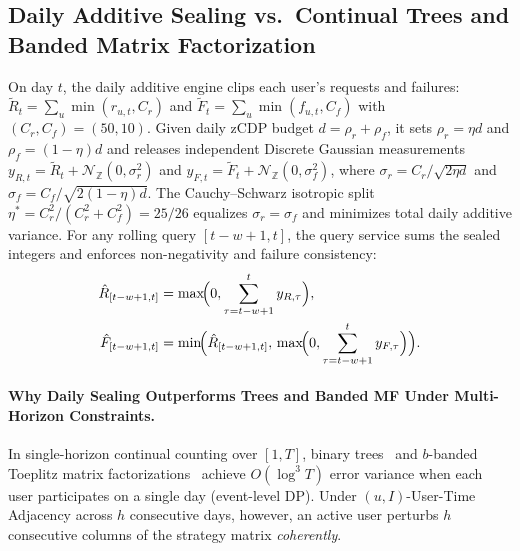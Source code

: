\documentclass[sigconf, nonacm]{acmart}
\begin{document}
\subsection{Daily Additive Sealing vs.\ Continual Trees and Banded Matrix Factorization}
On day $t$, the daily additive engine clips each user's requests and failures: $\tilde{R}_t = \sum_{u} \min(r_{u,t}, C_r)$ and $\tilde{F}_t = \sum_{u} \min(f_{u,t}, C_f)$ with $(C_r, C_f) = (50, 10)$. Given daily zCDP budget $d = \rho_r + \rho_f$, it sets $\rho_r = \eta d$ and $\rho_f = (1-\eta)d$ and releases independent Discrete Gaussian measurements $y_{R,t} = \tilde{R}_t + \mathcal{N}_{\mathbb{Z}}(0, \sigma_r^2)$ and $y_{F,t} = \tilde{F}_t + \mathcal{N}_{\mathbb{Z}}(0, \sigma_f^2)$, where $\sigma_r = C_r/\sqrt{2\eta d}$ and $\sigma_f = C_f/\sqrt{2(1-\eta)d}$. The Cauchy--Schwarz isotropic split $\eta^* = C_r^2 / (C_r^2 + C_f^2) = 25/26$ equalizes $\sigma_r = \sigma_f$ and minimizes total daily additive variance. For any rolling query $[t-w+1, t]$, the query service sums the sealed integers and enforces non-negativity and failure consistency:
\begin{equation}
\label{eq:postproc}
\begin{aligned}
\hat{R}_{[t-w+1, t]} &= \max\!\Bigl(0, \sum_{\tau=t-w+1}^t y_{R,\tau}\Bigr), \\
\hat{F}_{[t-w+1, t]} &= \min\!\Bigl(\hat{R}_{[t-w+1, t]},\, \max\!\Bigl(0, \sum_{\tau=t-w+1}^t y_{F,\tau}\Bigr)\Bigr).
\end{aligned}
\end{equation}

\paragraph{Why Daily Sealing Outperforms Trees and Banded MF Under Multi-Horizon Constraints.}
In single-horizon continual counting over $[1, T]$, binary trees~\cite{dwork2010continual,chan2011private} and $b$-banded Toeplitz matrix factorizations~\cite{fichtenberger2023constant,choquette2023banded} achieve $O(\log^3 T)$ error variance when each user participates on a single day (event-level DP). Under $(u, I)$-User-Time Adjacency across $h$ consecutive days, however, an active user perturbs $h$ consecutive columns of the strategy matrix \emph{coherently}.
\end{document}
